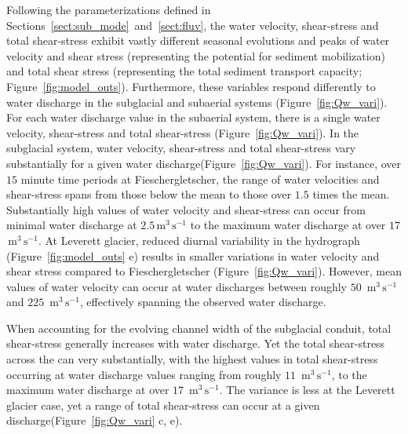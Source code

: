 \documentclass[draft]{agujournal2019}
\newcommand{\unit}[1]{$\mathrm{#1}$}
\begin{document}


 
Following the parameterizations defined in Sections~\ref{sect:sub_mode}~and~\ref{sect:fluv}, the water velocity, shear-stress and total shear-stress exhibit vastly different seasonal evolutions and peaks of water velocity and shear stress (representing the potential for sediment mobilization) and total shear stress (representing the total sediment transport capacity; Figure~\ref{fig:model_outs}).
Furthermore, these variables respond differently to water discharge in the subglacial and subaerial systems (Figure~\ref{fig:Qw_vari}).
For each water discharge value in the subaerial system, there is a single water velocity, shear-stress and total shear-stress (Figure~\ref{fig:Qw_vari}).
In the subglacial system, water velocity, shear-stress and total shear-stress vary substantially for a given water discharge(Figure~\ref{fig:Qw_vari}).
For instance, over $15$ minute time periods at Fieschergletscher, the range of water velocities and shear-stress spans from those below the mean to those over $1.5$ times the mean.
Substantially high values of water velocity and shear-stress can occur from minimal water discharge at $2.5$\,\unit{m}$^3$\,\unit{s}$^{-1}$ to the maximum water discharge at over $17$ \,\unit{m}$^3$\,\unit{s}$^{-1}$.
At Leverett glacier, reduced diurnal variability in the hydrograph  (Figure~\ref{fig:model_outs} e) results in smaller variations in water velocity and shear stress compared to Fieschergletscher (Figure~\ref{fig:Qw_vari}).
However, mean values of water velocity can occur at water discharges between roughly $50$ \,\unit{m}$^3$\,\unit{s}$^{-1}$ and $225$ \,\unit{m}$^3$\,\unit{s}$^{-1}$, effectively spanning the observed water discharge. 

When accounting for the evolving channel width of the subglacial conduit, total shear-stress generally increases with water discharge.
Yet the total shear-stress across the can very substantially, with the highest values in total shear-stress occurring at water discharge values ranging from roughly $11$ \,\unit{m}$^3$\,\unit{s}$^{-1}$, to the maximum water discharge at over $17$ \,\unit{m}$^3$\,\unit{s}$^{-1}$.
The variance is less at the Leverett glacier case, yet a range of total shear-stress can occur at a given discharge(Figure~\ref{fig:Qw_vari} c, e).
\end{document}
